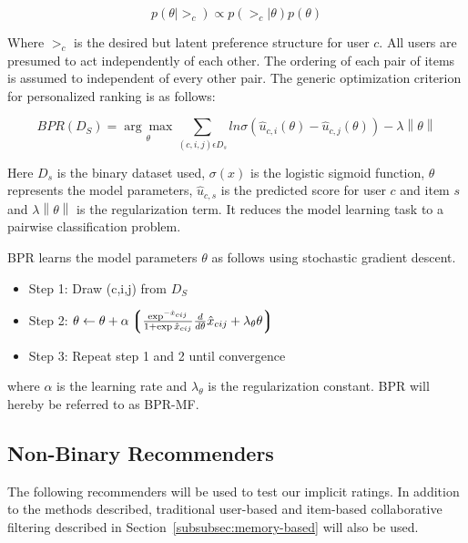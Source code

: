 \begin{equation}
p(\theta | >_c) \propto p(>_c | \theta) p(\theta)
\end{equation}

Where $>_c$ is the desired but latent preference structure for user $c$. All users are presumed to act
independently of each other. The ordering of each pair of items is assumed to independent of every other pair.
The generic optimization criterion for personalized ranking is as follows:

\begin{equation}
BPR(D_S) = \underset{\theta}{\arg\max} \sum_{(c,i,j)\epsilon D_s} ln \sigma(\hat{u}_{c,i}(\theta)-\hat{u}_{c,j}(\theta)) - \lambda \left\|\theta \right\|
\end{equation}

Here $D_s$ is the binary dataset used, $\sigma(x)$ is the logistic sigmoid function, $\theta$ represents
the model parameters, $\hat{u}_{c,s}$ is the predicted score for user $c$ and item $s$ and
$\lambda \left\|\theta \right\|$ is the regularization term. It reduces the model learning task to
a pairwise classification problem.\newline

BPR learns the model parameters $\theta$ as follows using stochastic gradient descent.

\begin{itemize}
\item Step 1: Draw (c,i,j) from $D_S$
\item Step 2: $\theta \leftarrow \theta + \alpha \left\lgroup \frac{\exp^{-\hat{x}_{cij}}}{1+\exp{\hat{x}_{cij}}}  \frac{d}{d \theta} \hat{x}_{cij} + \lambda_{\theta} \theta \right\rgroup$
\item Step 3: Repeat step 1 and 2 until convergence
\end{itemize}

where $\alpha$ is the learning rate and $\lambda_{\theta}$ is the regularization constant. BPR will hereby be
referred to as BPR-MF.

\subsection{Non-Binary Recommenders}

The following recommenders will be used to test our implicit ratings. In addition to the methods described,
traditional user-based and item-based collaborative filtering described in Section~\ref{subsubsec:memory-based} will
also be used.

